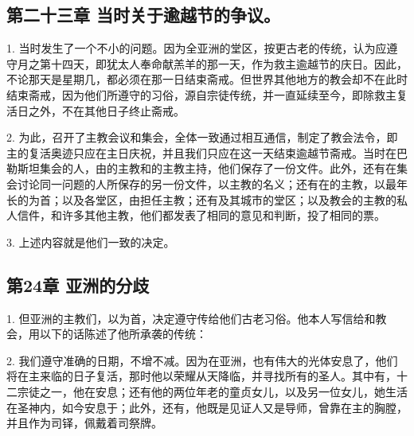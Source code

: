 
\subsection{第二十三章 当时关于逾越节的争议。}

1. 当时发生了一个不小的问题。因为全亚洲的堂区，按更古老的传统，认为应遵守月之第十四天，即犹太人奉命献羔羊的那一天，作为救主逾越节的庆日。因此，不论那天是星期几，都必须在那一日结束斋戒。但世界其他地方的教会却不在此时结束斋戒，因为他们所遵守的习俗，源自宗徒传统，并一直延续至今，即除救主复活日之外，不在其他日子终止斋戒。\par

2. 为此，召开了主教会议和集会，全体一致通过相互通信，制定了教会法令，即主的复活奥迹只应在主日庆祝，并且我们只应在这一天结束逾越节斋戒。当时在巴勒斯坦集会的人，由的主教和的主教主持，他们保存了一份文件。此外，还有在集会讨论同一问题的人所保存的另一份文件，以主教的名义；还有在的主教，以最年长的为首；以及各堂区，由担任主教；还有及其城市的堂区；以及教会的主教的私人信件，和许多其他主教，他们都发表了相同的意见和判断，投了相同的票。\par

3. 上述内容就是他们一致的决定。\par


\subsection{第24章 亚洲的分歧}

1. 但亚洲的主教们，以为首，决定遵守传给他们古老习俗。他本人写信给和教会，用以下的话陈述了他所承袭的传统：\par

2. 我们遵守准确的日期，不增不减。因为在亚洲，也有伟大的光体安息了，他们将在主来临的日子复活，那时他以荣耀从天降临，并寻找所有的圣人。其中有，十二宗徒之一，他在安息；还有他的两位年老的童贞女儿，以及另一位女儿，她生活在圣神内，如今安息于；此外，还有，他既是见证人又是导师，曾靠在主的胸膛，并且作为司铎，佩戴着司祭牌。\par


